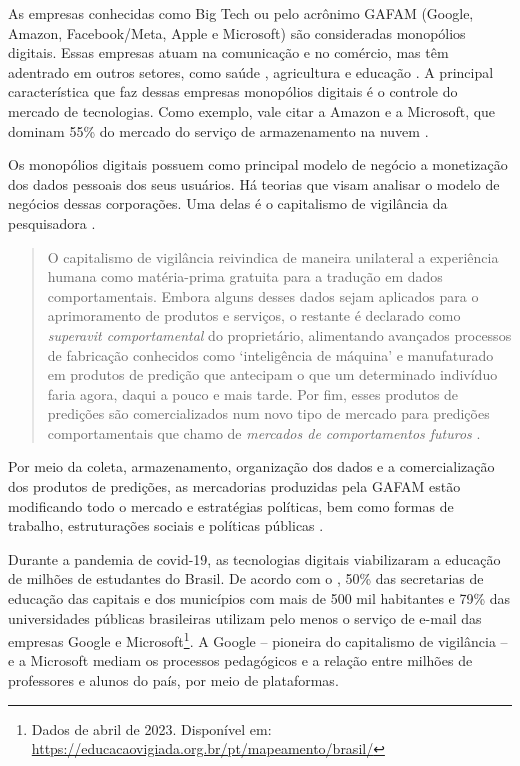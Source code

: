 \documentclass[portuguese]{textolivre}
\begin{document}
As empresas conhecidas como Big Tech ou pelo acrônimo GAFAM (Google, Amazon, Facebook/Meta, Apple e Microsoft) são consideradas monopólios digitais. Essas empresas atuam na comunicação e no comércio, mas têm adentrado em outros setores, como saúde \cite{redmond2022}, agricultura \cite{agrawal2020} e educação \cite{observatorioeducaçao}. A principal característica que faz dessas empresas monopólios digitais é o controle do mercado de tecnologias. Como exemplo, vale citar a Amazon e a Microsoft, que dominam 55\% do mercado do serviço de armazenamento na nuvem \cite{statista}.

Os monopólios digitais possuem como principal modelo de negócio a monetização dos dados pessoais dos seus usuários. Há teorias que visam analisar o modelo de negócios dessas corporações. Uma delas é o capitalismo de vigilância da pesquisadora \textcite{zuboff2020era}.

\begin{quote}
 O capitalismo de vigilância reivindica de maneira unilateral a experiência humana como matéria-prima gratuita para a tradução em dados comportamentais. Embora alguns desses dados sejam aplicados para o aprimoramento de produtos e serviços, o restante é declarado como \emph{superavit comportamental} do proprietário, alimentando avançados processos de fabricação conhecidos como ‘inteligência de máquina’ e manufaturado em produtos de predição que antecipam o que um determinado indivíduo faria agora, daqui a pouco e mais tarde. Por fim, esses produtos de predições são comercializados num novo tipo de mercado para predições comportamentais que chamo de \emph{mercados de comportamentos futuros} \cite[p. 18-19, grifos da autora]{zuboff2020era}.
\end{quote}

Por meio da coleta, armazenamento, organização dos dados e a comercialização dos produtos de predições, as mercadorias produzidas pela GAFAM estão modificando todo o mercado e estratégias políticas, bem como formas de trabalho, estruturações sociais e políticas públicas \cite{cruz_neoliberalismo_2020}.

Durante a pandemia de covid-19, as tecnologias digitais viabilizaram a educação de milhões de estudantes do Brasil. De acordo com o \textcite{observatorioeducaçao}, 50\% das secretarias de educação das capitais e dos municípios com mais de 500 mil habitantes e 79\% das universidades públicas brasileiras utilizam pelo menos o serviço de e-mail das empresas Google e Microsoft\footnote{Dados de abril de 2023. Disponível em: \url{https://educacaovigiada.org.br/pt/mapeamento/brasil/}}. A Google – pioneira do capitalismo de vigilância \cite{zuboff2020era} – e a Microsoft mediam os processos pedagógicos e a relação entre milhões de professores e alunos do país, por meio de plataformas.
\end{document}
